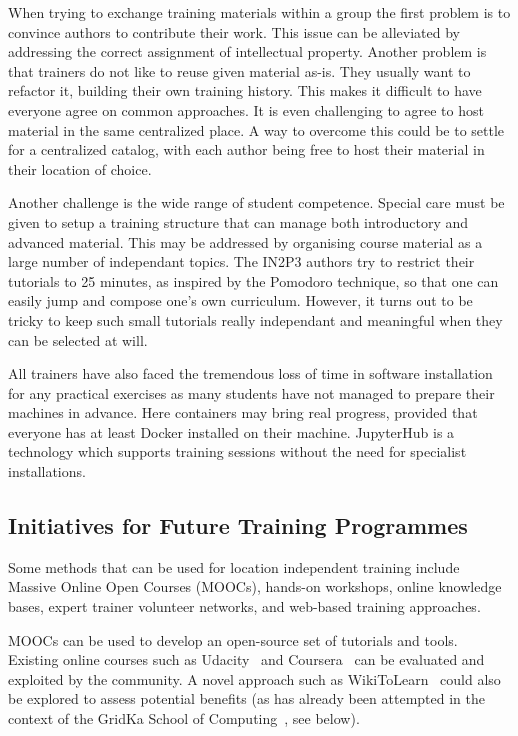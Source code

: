 \documentclass[12pt,a4paper]{article}
\begin{document}
When trying to exchange training materials within a group the first problem is
to convince authors to contribute their work. This issue
can be alleviated by addressing the correct assignment of intellectual property.
Another problem is that trainers do not like to reuse given material as-is. They usually
want to refactor it, building their own training history.
This makes it difficult to have everyone agree on common approaches.
It is even challenging to agree to host material in the same
centralized place. A way to overcome this could be to settle for a centralized
catalog, with each author being free to host their material in their location
of choice.

Another challenge is the wide range of student competence. Special care must be
given to setup a training structure that can manage both introductory and
advanced material. This may be addressed by organising course material as a
large number of independant topics. The IN2P3 authors try to restrict their
tutorials to 25 minutes, as inspired by the Pomodoro
technique\cite{PomodoroTechnique}, so that one can easily jump and compose one's
own curriculum. However, it turns out to be tricky to keep such small tutorials
really independant and meaningful when they can be selected at will.

All trainers have also faced the tremendous loss of time
in software installation for any practical exercises as many students have
not managed to prepare their machines in advance.
Here containers may bring real
progress, provided that everyone has at least Docker\cite{Docker} installed on
their machine.
JupyterHub\cite{JupyterHub} is a technology which supports training sessions
without the need for specialist installations.

\subsection{Initiatives for Future Training Programmes\label{sec:initiatives}}

Some methods that can be used for location independent training include Massive
Online Open Courses (MOOCs), hands-on workshops, online knowledge bases, expert trainer volunteer
networks, and web-based training approaches.

MOOCs can be used to develop an open-source set of
tutorials and tools. Existing online courses such as Udacity~\cite{Udacity} and
Coursera~\cite{Coursera} can be
evaluated and exploited by the community. A novel approach such as
WikiToLearn~\cite{WikiToLearn} could also be explored to assess potential benefits (as has already been attempted
in the context of the GridKa School of Computing~\cite{GridKa}, see below).
\end{document}
